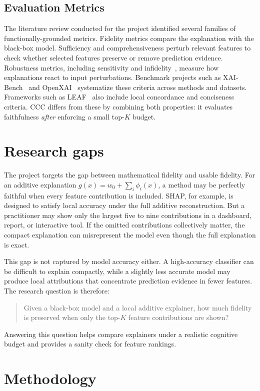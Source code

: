 \documentclass[sigconf,nonacm]{acmart}
\begin{document}
\subsection{Evaluation Metrics}
The literature review conducted for the project identified several families of
functionally-grounded metrics. Fidelity metrics compare the explanation with the
black-box model. Sufficiency and comprehensiveness perturb relevant features to
check whether selected features preserve or remove prediction evidence.
Robustness metrics, including sensitivity and infidelity~\cite{yeh2019infidelity},
measure how explanations react to input perturbations. Benchmark projects such
as XAI-Bench~\cite{liu2021xaibench} and OpenXAI~\cite{agarwal2022openxai}
systematize these criteria across methods and datasets. Frameworks such as
LEAF~\cite{amparore2021leaf} also include local concordance and conciseness
criteria. CCC differs from these by combining both properties: it evaluates
faithfulness \emph{after} enforcing a small top-$K$ budget.

\section{Research gaps}
The project targets the gap between mathematical fidelity and usable fidelity.
For an additive explanation
$g(x)=w_0+\sum_i \phi_i(x)$, a method may be perfectly faithful when every
feature contribution is included. SHAP, for example, is designed to satisfy
local accuracy under the full additive reconstruction. But a practitioner may
show only the largest five to nine contributions in a dashboard, report, or
interactive tool. If the omitted contributions collectively matter, the compact
explanation can misrepresent the model even though the full explanation is
exact.

This gap is not captured by model accuracy either. A high-accuracy classifier
can be difficult to explain compactly, while a slightly less accurate model may
produce local attributions that concentrate prediction evidence in fewer
features. The research question is therefore:
\begin{quote}
  Given a black-box model and a local additive explainer, how much fidelity is
  preserved when only the top-$K$ feature contributions are shown?
\end{quote}
Answering this question helps compare explainers under a realistic cognitive
budget and provides a sanity check for feature rankings.

\section{Methodology}
\end{document}
